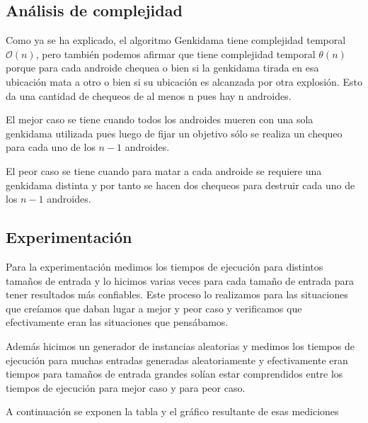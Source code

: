 \documentclass[10pt,a4paper]{article}
\begin{document}
\subsection{Análisis de complejidad}
Como ya se ha explicado, el algoritmo Genkidama tiene complejidad temporal $\mathcal{O}(n)$, pero también podemos afirmar que tiene complejidad temporal $\mathcal{\theta}(n)$ porque para cada androide chequea o  bien si la genkidama tirada en esa ubicación mata a otro o bien si su ubicación es alcanzada por otra explosión. Esto da una cantidad de chequeos de al menos n pues hay n androides.
\par{El mejor caso se tiene cuando todos los androides mueren con una sola genkidama utilizada pues luego de fijar un objetivo sólo se realiza un chequeo para cada uno de los $n-1$ androides.}
\par{El peor caso se tiene cuando para matar a cada androide se requiere una genkidama distinta y por tanto se hacen dos chequeos para destruir cada uno de los $n-1$ androides.}

\newpage
\subsection{Experimentación}
Para la experimentación medimos los tiempos de ejecución para distintos tamaños de entrada y lo hicimos varias veces para cada tamaño de entrada para tener resultados más confiables. Este proceso lo realizamos para las situaciones que creíamos que daban lugar a mejor y peor caso y verificamos que efectivamente eran las situaciones que pensábamos.
\par{Además hicimos un generador de instancias aleatorias y medimos los tiempos de ejecución para muchas entradas generadas aleatoriamente y efectivamente eran tiempos para tamaños de entrada grandes solían estar comprendidos entre los tiempos de ejecución para mejor caso y para peor caso.}
\par{A continuación se exponen la tabla y el gráfico resultante de esas mediciones}\\
\end{document}
